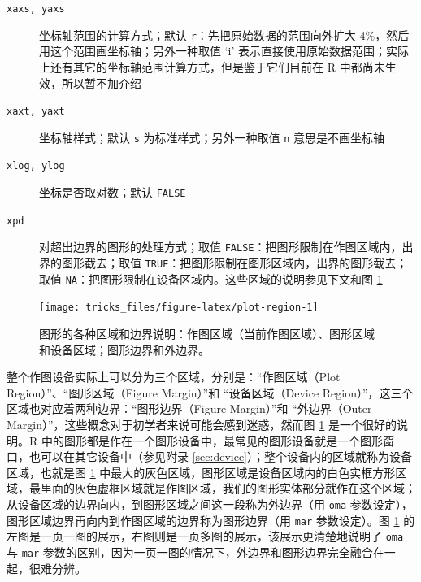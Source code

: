 \documentclass[
  b5paper,
  UTF8,twoside]{book}
\begin{document}
\begin{description}
\item[\texttt{xaxs,\ yaxs}]
坐标轴范围的计算方式；默认 \texttt{\textquotesingle{}r\textquotesingle{}}：先把原始数据的范围向外扩大 4\%，然后用这个范围画坐标轴；另外一种取值 `i' 表示直接使用原始数据范围；实际上还有其它的坐标轴范围计算方式，但是鉴于它们目前在 R 中都尚未生效，所以暂不加介绍
\item[\texttt{xaxt,\ yaxt}]
坐标轴样式；默认 \texttt{\textquotesingle{}s\textquotesingle{}} 为标准样式；另外一种取值 \texttt{\textquotesingle{}n\textquotesingle{}} 意思是不画坐标轴
\item[\texttt{xlog,\ ylog}]
坐标是否取对数；默认 \texttt{FALSE}
\item[\texttt{xpd}]
对超出边界的图形的处理方式；取值 \texttt{FALSE}：把图形限制在作图区域内，出界的图形截去；取值 \texttt{TRUE}：把图形限制在图形区域内，出界的图形截去；取值 \texttt{NA}：把图形限制在设备区域内。这些区域的说明参见下文和图 \ref{fig:plot-region}
\end{description}

\begin{figure}

{\centering \texttt{[image: tricks\_files/figure-latex/plot-region-1]} 

}

\caption[图形的各种区域说明]{图形的各种区域和边界说明：作图区域（当前作图区域）、图形区域和设备区域；图形边界和外边界。}\label{fig:plot-region}
\end{figure}





整个作图设备实际上可以分为三个区域，分别是：``作图区域（Plot Region）''、``图形区域（Figure Margin）''和 ``设备区域（Device Region）''，这三个区域也对应着两种边界：``图形边界（Figure Margin）''和 ``外边界（Outer Margin）''，这些概念对于初学者来说可能会感到迷惑，然而图 \ref{fig:plot-region} 是一个很好的说明。R 中的图形都是作在一个图形设备中，最常见的图形设备就是一个图形窗口，也可以在其它设备中（参见附录 \ref{sec:device}）；整个设备内的区域就称为设备区域，也就是图 \ref{fig:plot-region} 中最大的灰色区域，图形区域是设备区域内的白色实框方形区域，最里面的灰色虚框区域就是作图区域，我们的图形实体部分就作在这个区域；从设备区域的边界向内，到图形区域之间这一段称为外边界（用 \texttt{oma} 参数设定），图形区域边界再向内到作图区域的边界称为图形边界（用 \texttt{mar} 参数设定）。图 \ref{fig:plot-region} 的左图是一页一图的展示，右图则是一页多图的展示，该展示更清楚地说明了 \texttt{oma} 与 \texttt{mar} 参数的区别，因为一页一图的情况下，外边界和图形边界完全融合在一起，很难分辨。
\end{document}

